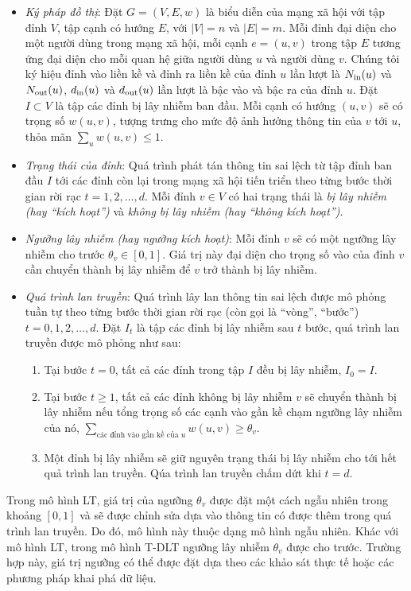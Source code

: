  	\begin {itemize}
 	\item {\itshape Ký pháp đồ thị}: Đặt $G=(V,E,w)$ là biểu diễn của mạng xã hội với tập đỉnh $V$, tập cạnh có hướng $E$, với $|V|=n$ và $|E|=m$. Mỗi đỉnh đại diện cho một người dùng trong mạng xã hội, mỗi cạnh $e=(u,v)$ trong tập $E$ tương ứng đại diện cho mỗi quan hệ giữa người dùng $u$ và người dùng $v$. Chúng tôi ký hiệu đỉnh vào liền kề và đỉnh ra liền kề của đỉnh $u$ lần lượt là $N_{\textup{in}}(u)$ và $N_{\textup{out}}(u)$, $d_{\textup{in}}(u)$ và $d_{\textup{out}}(u)$ lần lượt là bậc vào và bậc ra của đỉnh $u$. Đặt $I \subset V$ là tập các đỉnh bị lây nhiễm ban đầu. Mỗi cạnh có hướng $(u,v)$ sẽ có trọng số $w(u,v)$, tượng trưng cho mức độ ảnh hưởng thông tin của $v$ tới $u$, thỏa mãn $\sum_{u} w(u,v) \leq 1$.
 	
 	\item {\itshape Trạng thái của đỉnh}: Quá trình phát tán thông tin sai lệch từ tập đỉnh ban đầu $I$ tới các đỉnh còn lại trong mạng xã hội tiến triển theo từng bước thời gian rời rạc $t=1,2,…,d$. Mỗi đỉnh $v \in V$ có hai trạng thái là {\itshape bị lây nhiễm (hay “kích hoạt”)} và {\itshape không bị lây nhiễm (hay “không kích hoạt”)}.
 	
 	\item {\itshape Ngưỡng lây nhiễm (hay ngưỡng kích hoạt)}: Mỗi đỉnh $v$ sẽ có một ngưỡng lây nhiễm cho trước $\theta_{v} \in [0,1]$. Giá trị này đại diện cho trọng số vào của đỉnh $v$ cần chuyển thành bị lây nhiễm để $v$ trở thành bị lây nhiễm.
 	
 	\item {\itshape Quá trình lan truyền}: Quá trình lây lan thông tin sai lệch được mô phỏng tuần tự theo từng bước thời gian rời rạc (còn gọi là “vòng”, “bước”) $t=0,1,2,…,d$. Đặt $I_{t}$ là tập các đỉnh bị lây nhiễm sau $t$ bước, quá trình lan truyền được mô phỏng như sau:
 	\begin {enumerate} [+]
 	\item Tại bước $t=0$, tất cả các đỉnh trong tập $I$ đều bị lây nhiễm, $I_{0}=I$.
 	
 	\item Tại bước $t\geq1$, tất cả các đỉnh không bị lây nhiễm $v$ sẽ chuyển thành bị lây nhiễm nếu tổng trọng số các cạnh vào gần kề chạm ngưỡng lây nhiễm của nó, $\sum_{\text{các đỉnh vào gần kề của $u$}} w(u,v) \geq \theta_{v}$.	
 	
 	\item Một đỉnh bị lây nhiễm sẽ giữ nguyên trạng thái bị lây nhiễm cho tới hết quả trình lan truyền. Qúa trình lan truyền chấm dứt khi $t = d$.
 	\end {enumerate}
 	\end {itemize}
 	Trong mô hình LT, giá trị của ngưỡng $\theta_{v}$ được đặt một cách ngẫu nhiên trong khoảng $[0,1]$ và sẽ được chỉnh sửa dựa vào thông tin có được thêm trong quá trình lan truyền. Do đó, mô hình này thuộc dạng mô hình ngẫu nhiên. Khác với mô hình LT, trong mô hình T-DLT ngưỡng lây nhiễm $\theta_{v}$ được cho trước. Trường hợp này, giá trị ngưỡng có thể được đặt dựa theo các khảo sát thực tế hoặc các phương pháp khai phá dữ liệu.
 	
